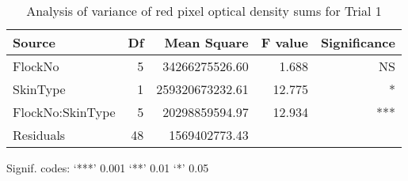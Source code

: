 \begin{table}[ht]
\centering
\caption{Analysis of variance of red pixel optical density sums for Trial 1}
\label{tab:redpixelt1aov}
\begin{tabular}{lrrrr}
  \hline
 Source & Df &  Mean Square & F value & Significance \\ 
  \hline
FlockNo          & 5 &  34266275526.60 & 1.688 & NS \\ 
  SkinType         & 1 & 259320673232.61 & 12.775 & * \\ 
  FlockNo:SkinType & 5 & 20298859594.97 & 12.934 & *** \\ 
  Residuals        & 48 & 1569402773.43 &  &  \\ 
   \hline
\end{tabular}
\begin{tabbing}
  Signif. codes: ‘***’ 0.001 ‘**’ 0.01 ‘*’ 0.05  \\
\end{tabbing}
\end{table}

